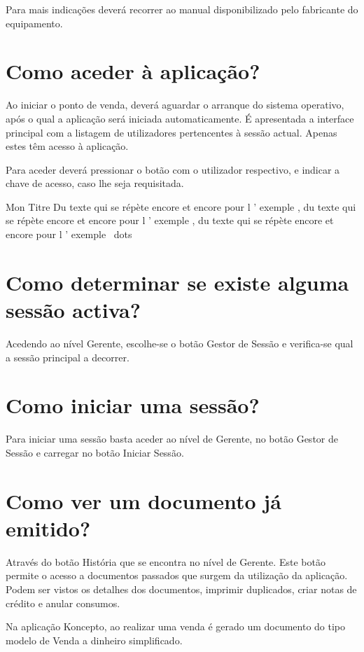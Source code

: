 \documentclass[a4paper,11pt,openany]{memoir}
\begin{document}
Para mais indicações deverá recorrer ao manual disponibilizado pelo fabricante do
equipamento.

\section{Como aceder à aplicação?}

Ao iniciar o ponto de venda, deverá aguardar o arranque do sistema operativo, após
o qual a aplicação será iniciada automaticamente. É apresentada a interface
principal com a listagem de utilizadores pertencentes à sessão actual. Apenas estes
têm acesso à aplicação.

Para aceder deverá pressionar o botão com o utilizador respectivo, e indicar a chave
de acesso, caso lhe seja requisitada.


\begin{bclogo}[logo=\bclampe]{Mon Titre}
Du texte qui se répète encore et encore pour l ’ exemple , du texte qui
se répète encore et encore pour l ’ exemple , du texte qui se répète
encore et encore pour l ’ exemple \ dots
\end{bclogo}




\section{Como determinar se existe alguma sessão activa?}
Acedendo ao nível Gerente, escolhe-se o botão Gestor de Sessão e verifica-se qual
a sessão principal a decorrer.

\section{Como iniciar uma sessão?}
Para iniciar uma sessão basta aceder ao nível de Gerente, no botão Gestor de
Sessão e carregar no botão Iniciar Sessão.


\section{Como ver um documento já emitido?}
Através do botão História que se encontra no nível de Gerente.
Este botão permite o
acesso a documentos passados que surgem da utilização da aplicação. Podem ser
vistos os detalhes dos documentos, imprimir duplicados,
criar notas de crédito e anular consumos.

Na aplicação Koncepto, ao realizar uma venda é gerado um documento do tipo
modelo de Venda a dinheiro simplificado.
\end{document}
